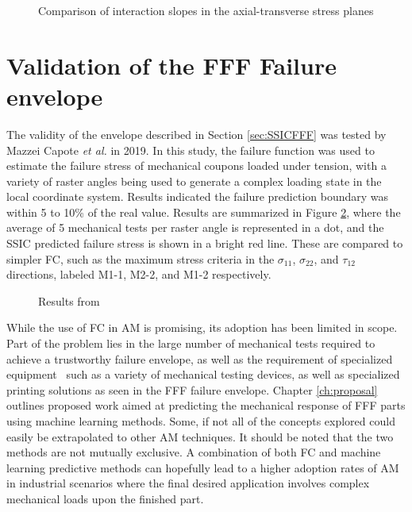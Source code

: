 \documentclass[main.tex]{subfiles}
\begin{document}
\pagebreak

\begin{figure}[h]
	\center
	\linebreak
	\caption{Comparison of interaction slopes in the axial-transverse stress planes} \label{fig:SSIcomp}
\end{figure}

\section{Validation of the FFF Failure envelope}\label{sec:FFFval}

The validity of the envelope described in Section \ref{sec:SSICFFF} was tested by Mazzei Capote  \emph{et al.} \cite{MazzeiJCompSci} in 2019. In this study, the failure function was used to estimate the failure stress of mechanical coupons loaded under tension, with a variety of raster angles being used to generate a complex loading state in the local coordinate system. Results indicated the failure prediction boundary was within 5 to 10\% of the real value. Results are summarized in Figure \ref{fig:jcompscir}, where the average of 5 mechanical tests per raster angle is represented in a dot, and the SSIC predicted failure stress is shown in a bright red line. These are compared to simpler FC, such as the maximum stress criteria in the $\sigma_{11}$, $\sigma_{22}$, and $\tau_{12}$ directions, labeled M1-1, M2-2, and M1-2 respectively. 

\begin{figure}[!htbp]
	\center
	\hfill
	\caption{Results from \cite{MazzeiJCompSci}} \label{fig:jcompscir}
\end{figure} 


While the use of FC in AM is promising, its adoption has been limited in scope. Part of the problem lies in the large number of mechanical tests required to achieve a trustworthy failure envelope, as well as the requirement of specialized equipment \textendash~such as a variety of mechanical testing devices, as well as specialized printing solutions as seen in the FFF failure envelope. Chapter \ref{ch:proposal} outlines proposed work aimed at predicting the mechanical response of FFF parts using machine learning methods. Some, if not all of the concepts explored could easily be extrapolated to other AM techniques. It should be noted that the two methods are not mutually exclusive. A combination of both FC and machine learning predictive methods can hopefully lead to a higher adoption rates of AM in industrial scenarios where the final desired application involves complex mechanical loads upon the finished part. 
\end{document}
